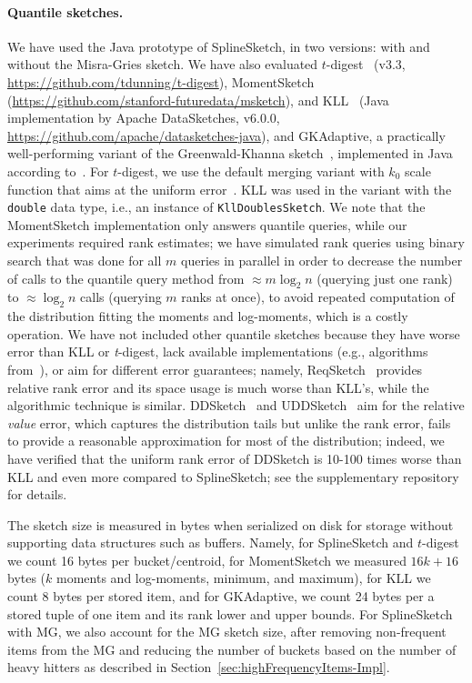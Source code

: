 \documentclass[acmsmall]{acmart}
\theoremstyle{remark}
\begin{document}
\vspace{-0.2cm}

\paragraph{Quantile sketches.}
We have used the Java prototype of SplineSketch, in two versions: with and without the Misra-Gries sketch.
We have also evaluated $t$-digest~\cite{dunning19-t-digest} (v3.3, \url{https://github.com/tdunning/t-digest}), MomentSketch~\cite{GanDTSB18} (\url{https://github.com/stanford-futuredata/msketch}), and KLL~\cite{KarninLL16} (Java implementation by Apache DataSketches, v6.0.0, \url{https://github.com/apache/datasketches-java}), and GKAdaptive, a practically well-performing variant of the Greenwald-Khanna sketch~\cite{greenwald2001space},
	implemented in Java according to~\cite{luo16_quantiles_experimental}.
For $t$-digest, we use the default merging variant with $k_0$ scale function that aims at the uniform error~\cite{dunning19-t-digest}.
KLL was used in the variant with the \texttt{double} data type, i.e., an instance of \texttt{KllDoublesSketch}.
We note that the MomentSketch implementation only answers quantile queries, while
our experiments required rank estimates; we have simulated rank queries using binary search
that was done for all $m$ queries in parallel in order to decrease the number of
calls to the quantile query method from $\approx m \log_2 n$ (querying just one rank) to $\approx \log_2 n$ calls (querying $m$ ranks at once), to avoid repeated computation of the distribution fitting the moments and log-moments, which is a costly operation.
We have not included other quantile sketches because they have worse error than KLL or \textit{t}\mbox{-}digest, lack available implementations (e.g., algorithms from~\cite{SchieferCINSW23-KLLinterpolation,GribelyukSWY25elasticCompactors}), or aim for different error guarantees;
namely, ReqSketch~\cite{CormodeKLTV23} provides relative rank error and its space usage is much worse than KLL's, while
the algorithmic technique is similar.
DDSketch~\cite{MassonRL19} and UDDSketch~\cite{EpicocoMCPM20} aim for the relative \emph{value} error, which captures the distribution tails
but unlike the rank error, fails to provide a reasonable approximation for most of the distribution;
indeed, we have verified that the uniform rank error of DDSketch is 10-100 times worse than KLL and even more compared to SplineSketch;
see the supplementary repository for details.

The sketch size is measured in bytes when serialized on disk for storage without supporting
data structures such as buffers. Namely, for SplineSketch and $t$-digest we count 16 bytes per bucket/centroid,
for MomentSketch we measured $16k + 16$ bytes ($k$ moments and log-moments, minimum, and maximum), for KLL we count 8 bytes per stored item,
and for GKAdaptive, we count 24 bytes per a stored tuple of one item and its rank lower and upper bounds.
For SplineSketch with MG, we also account for the MG sketch size, after removing non-frequent items from the MG and reducing the number of buckets based on the number of heavy hitters as described in Section~\ref{sec:highFrequencyItems-Impl}.
\end{document}
